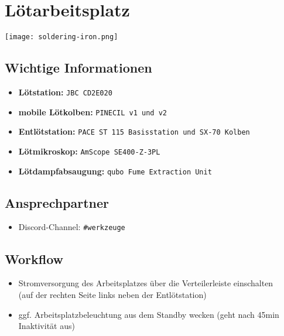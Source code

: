\documentclass[a5paper]{article}
\begin{document}
	
	\noindent
	\begin{minipage}{0.25\textwidth}
		\section*{Lötarbeitsplatz}
	\end{minipage}
	\hfill
	\begin{minipage}{0.1\textwidth}
		\texttt{[image: soldering-iron.png]}	
	\end{minipage}
	\hspace{1em}
	\begin{minipage}{0.1\textwidth}
				
	\end{minipage}%
	
	\subsection*{Wichtige Informationen}
	\begin{itemize}
		\item \textbf{Lötstation:} \texttt{JBC CD2E020}
		\item \textbf{mobile Lötkolben:} \texttt{PINECIL v1 und v2}
		\item \textbf{Entlötstation:} \texttt{PACE ST 115 Basisstation und SX-70 Kolben}
		\item \textbf{Lötmikroskop:} \texttt{AmScope SE400-Z-3PL}
		\item \textbf{Lötdampfabsaugung:} \texttt{qubo Fume Extraction Unit}
	\end{itemize}
	
	\noindent\dotfill
	\subsection*{Ansprechpartner}
	\begin{itemize}
		\item Discord-Channel: \colorbox{gray!30}{\texttt{\#werkzeuge}}
	\end{itemize}
	
	\noindent\dotfill
	\subsection*{Workflow}
	\begin{itemize}
	    \item Stromversorgung des Arbeitsplatzes über die Verteilerleiste einschalten\\ (auf der rechten Seite links neben der Entlötstation)
	    \item ggf. Arbeitsplatzbeleuchtung aus dem Standby wecken (geht nach 45min Inaktivität aus)
	\end{itemize}
	
\end{document}
